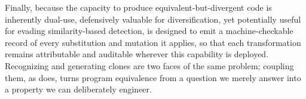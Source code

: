 Finally, because the capacity to produce equivalent-but-divergent code is inherently dual-use, defensively valuable for diversification, yet potentially useful for evading similarity-based detection, \sys is designed to emit a machine-checkable record of every substitution and mutation it applies, so that each transformation remains attributable and auditable wherever this capability is deployed. Recognizing and generating clones are two faces of the same problem; coupling them, as \sys does, turns program equivalence from a question we merely answer into a property we can deliberately engineer.
